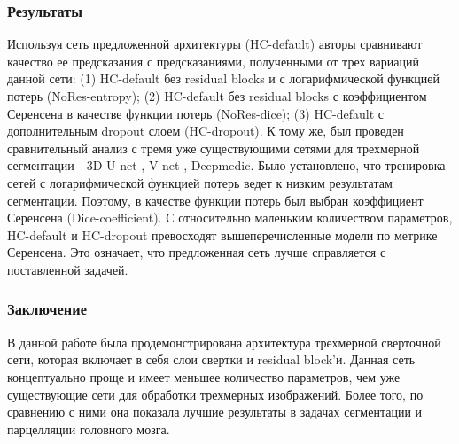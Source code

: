 \subsubsection*{Результаты}
Используя сеть предложенной архитектуры (HC-default) авторы сравнивают
качество ее предсказания с предсказаниями, полученными от трех вариаций данной сети: 
(1) HC-default без residual blocks и с логарифмической функцией потерь (NoRes-entropy); (2) HC-default без residual blocks с
 коэффициентом Серенсена в качестве функции потерь (NoRes-dice); (3) HC-default с дополнительным dropout слоем (HC-dropout). 
 К тому же, был проведен сравнительный анализ с тремя уже существующими сетями для трехмерной сегментации - 3D U-net \cite{Unet}, V-net \cite{VNet}, 
 Deepmedic. Было установлено, что тренировка сетей с логарифмической функцией потерь ведет к низким результатам сегментации.
  Поэтому, в качестве функции потерь был выбран коэффициент Серенсена (Dice-coefficient). С относительно маленьким количеством параметров, 
  HC-default и HC-dropout превосходят вышеперечисленные модели по метрике Серенсена. Это означает, что предложенная сеть лучше справляется с
   поставленной задачей. \par
\subsubsection*{Заключение}
В данной работе была продемонстрирована архитектура трехмерной сверточной сети, 
которая включает в себя слои свертки и residual block'и. Данная сеть концептуально 
проще и имеет меньшее количество параметров, чем уже существующие сети для обработки 
трехмерных изображений. Более того, по сравнению с ними она показала лучшие результаты 
в задачах сегментации и парцелляции головного мозга. 